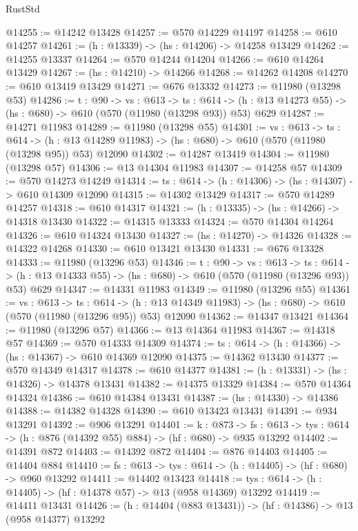 \begin{lexlean}{RustStd}
\begin{coremodule}
@14255 := @14242 @13428
@14257 := @570 @14229 @14197
@14258 := @610 @14257
@14261 := (h : @13339) -> (hs : @14206) -> @14258 @13429
@14262 := @14255 @13337
@14264 := @570 @14244 @14204
@14266 := @610 @14264 @13429
@14267 := (hs : @14210) -> @14266
@14268 := @14262 @14208
@14270 := @610 @13419 @13429
@14271 := @676 @13332
@14273 := @11980 (@13298 @53)
@14286 := {t : @90} ->
  {vs : @613} ->
  {ts : @614} -> (h : @13 @14273 @55) -> (hs : @680) -> @610 (@570 (@11980 (@13298 @93)) @53) @629
@14287 := @14271 @11983
@14289 := @11980 (@13298 @55)
@14301 := {vs : @613} ->
  {ts : @614} ->
  (h : @13 @14289 @11983) -> (hs : @680) -> @610 (@570 (@11980 (@13298 @95)) @53) @12090
@14302 := @14287 @13419
@14304 := @11980 (@13298 @57)
@14306 := @13 @14304 @11983
@14307 := @14258 @57
@14309 := @570 @14273 @14249
@14314 := {ts : @614} -> (h : @14306) -> (hs : @14307) -> @610 @14309 @12090
@14315 := @14302 @13429
@14317 := @570 @14289 @14257
@14318 := @610 @14317
@14321 := (h : @13335) -> (hs : @14266) -> @14318 @13430
@14322 := @14315 @13333
@14324 := @570 @14304 @14264
@14326 := @610 @14324 @13430
@14327 := (hs : @14270) -> @14326
@14328 := @14322 @14268
@14330 := @610 @13421 @13430
@14331 := @676 @13328
@14333 := @11980 (@13296 @53)
@14346 := {t : @90} ->
  {vs : @613} ->
  {ts : @614} -> (h : @13 @14333 @55) -> (hs : @680) -> @610 (@570 (@11980 (@13296 @93)) @53) @629
@14347 := @14331 @11983
@14349 := @11980 (@13296 @55)
@14361 := {vs : @613} ->
  {ts : @614} ->
  (h : @13 @14349 @11983) -> (hs : @680) -> @610 (@570 (@11980 (@13296 @95)) @53) @12090
@14362 := @14347 @13421
@14364 := @11980 (@13296 @57)
@14366 := @13 @14364 @11983
@14367 := @14318 @57
@14369 := @570 @14333 @14309
@14374 := {ts : @614} -> (h : @14366) -> (hs : @14367) -> @610 @14369 @12090
@14375 := @14362 @13430
@14377 := @570 @14349 @14317
@14378 := @610 @14377
@14381 := (h : @13331) -> (hs : @14326) -> @14378 @13431
@14382 := @14375 @13329
@14384 := @570 @14364 @14324
@14386 := @610 @14384 @13431
@14387 := (hs : @14330) -> @14386
@14388 := @14382 @14328
@14390 := @610 @13423 @13431
@14391 := @934 @13291
@14392 := @906 @13291
@14401 := {k : @873} ->
  {fs : @613} -> {tys : @614} -> (h : @876 (@14392 @55) @884) -> (hf : @680) -> @935 @13292
@14402 := @14391 @872
@14403 := @14392 @872
@14404 := @876 @14403
@14405 := @14404 @884
@14410 := {fs : @613} -> {tys : @614} -> (h : @14405) -> (hf : @680) -> @960 @13292
@14411 := @14402 @13423
@14418 := {tys : @614} -> (h : @14405) -> (hf : @14378 @57) -> @13 (@958 @14369) @13292
@14419 := @14411 @13431
@14426 := (h : @14404 (@883 @13431)) -> (hf : @14386) -> @13 (@958 @14377) @13292

\end{coremodule}
\end{lexlean}
